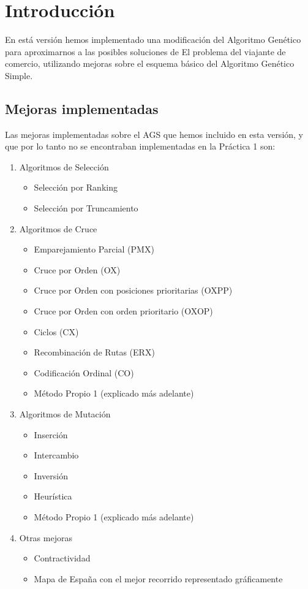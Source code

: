 \documentclass{article}
\begin{document}
\newpage
\section{Introducción}
En está versión hemos implementado una modificación del Algoritmo Genético para aproximarnos a las posibles soluciones de El problema del viajante de comercio, utilizando mejoras sobre el esquema básico del Algoritmo Genético Simple.

\subsection{Mejoras implementadas}
Las mejoras implementadas sobre el AGS que hemos incluido en esta versión, y que por lo tanto no se encontraban implementadas en la Práctica 1 son:


\begin{enumerate}
	\item Algoritmos de Selección
		\begin{itemize}
			\item Selección por Ranking
			\item Selección por Truncamiento
		\end{itemize}
	\item Algoritmos de Cruce
		\begin{itemize}
			\item Emparejamiento Parcial (PMX)
			\item Cruce por Orden (OX)
			\item Cruce por Orden con posiciones prioritarias (OXPP)
			\item Cruce por Orden con orden prioritario (OXOP)
			\item Ciclos (CX)
			\item Recombinación de Rutas (ERX)
			\item Codificación Ordinal (CO)
			\item Método Propio 1 (explicado más adelante)
		\end{itemize}
	\item Algoritmos de Mutación
		\begin{itemize}
			\item Inserción
			\item Intercambio
			\item Inversión
			\item Heurística
			\item Método Propio 1 (explicado más adelante)
		\end{itemize}
	\item Otras mejoras
		\begin{itemize}
			\item Contractividad
			\item Mapa de España con el mejor recorrido representado gráficamente
		\end{itemize}

\end{enumerate}
\end{document}
